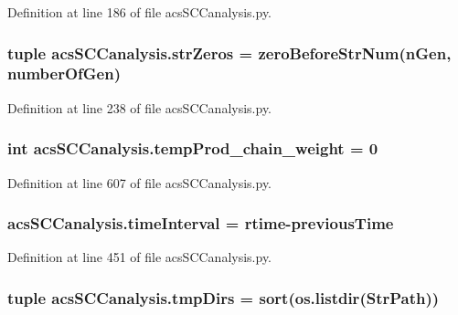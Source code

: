 Definition at line 186 of file acs\-S\-C\-Canalysis.\-py.

\hypertarget{a00096_a8ba6aefb71b3d1e575eac38627f143d6}{
\subsubsection[{str\-Zeros}]{\setlength{\rightskip}{0pt plus 5cm}tuple acs\-S\-C\-Canalysis.\-str\-Zeros = {\bf zero\-Before\-Str\-Num}(n\-Gen, {\bf number\-Of\-Gen})}}\label{a00096_a8ba6aefb71b3d1e575eac38627f143d6}


Definition at line 238 of file acs\-S\-C\-Canalysis.\-py.

\hypertarget{a00096_aaf17c99825e0961e4cfaa173ddfffe84}{
\subsubsection[{temp\-Prod\-\_\-chain\-\_\-weight}]{\setlength{\rightskip}{0pt plus 5cm}int acs\-S\-C\-Canalysis.\-temp\-Prod\-\_\-chain\-\_\-weight = 0}}\label{a00096_aaf17c99825e0961e4cfaa173ddfffe84}


Definition at line 607 of file acs\-S\-C\-Canalysis.\-py.

\hypertarget{a00096_a7d0f86310c439e970e0b41121364027c}{
\subsubsection[{time\-Interval}]{\setlength{\rightskip}{0pt plus 5cm}acs\-S\-C\-Canalysis.\-time\-Interval = {\bf rtime}-\/{\bf previous\-Time}}}\label{a00096_a7d0f86310c439e970e0b41121364027c}


Definition at line 451 of file acs\-S\-C\-Canalysis.\-py.

\hypertarget{a00096_ace4c571efd2e5ecd266ce5701f761a83}{
\subsubsection[{tmp\-Dirs}]{\setlength{\rightskip}{0pt plus 5cm}tuple acs\-S\-C\-Canalysis.\-tmp\-Dirs = sort(os.\-listdir({\bf Str\-Path}))}}\label{a00096_ace4c571efd2e5ecd266ce5701f761a83}


